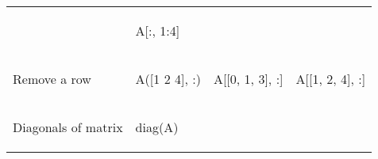 \documentclass[10pt, landscape]{article}
\newenvironment{Shaded}{}{}
\newcommand{\DecValTok}[1]{\textcolor[rgb]{0.25,0.63,0.44}{{#1}}}
\newcommand{\FloatTok}[1]{\textcolor[rgb]{0.25,0.63,0.44}{{#1}}}
\newcommand{\NormalTok}[1]{{#1}}
\begin{document}
\begin{multicols*}{2}
\begin{tabular}[ ]{@{}llll@{}}
\begin{minipage}[t]{0.23\columnwidth}
\strut
\end{minipage} & \begin{minipage}[t]{0.20\columnwidth}\raggedright\strut
\begin{Shaded}
\begin{Highlighting}[]
\NormalTok{A[:, }\FloatTok{1}\NormalTok{:}\FloatTok{4}\NormalTok{]}
\end{Highlighting}
\end{Shaded}
\strut
\end{minipage}\tabularnewline
\begin{minipage}[t]{0.23\columnwidth}\raggedright\strut
Remove a row\strut
\end{minipage} & \begin{minipage}[t]{0.23\columnwidth}\raggedright\strut
\begin{Shaded}
\begin{Highlighting}[]
\NormalTok{A([}\FloatTok{1} \FloatTok{2} \FloatTok{4}\NormalTok{], :)}
\end{Highlighting}
\end{Shaded}
\strut
\end{minipage} & \begin{minipage}[t]{0.23\columnwidth}\raggedright\strut
\begin{Shaded}
\begin{Highlighting}[]
\NormalTok{A[[}\DecValTok{0}\NormalTok{, }\DecValTok{1}\NormalTok{, }\DecValTok{3}\NormalTok{], :]}
\end{Highlighting}
\end{Shaded}
\strut
\end{minipage} & \begin{minipage}[t]{0.20\columnwidth}\raggedright\strut
\begin{Shaded}
\begin{Highlighting}[]
\NormalTok{A[[}\FloatTok{1}\NormalTok{, }\FloatTok{2}\NormalTok{, }\FloatTok{4}\NormalTok{], :]}
\end{Highlighting}
\end{Shaded}
\strut
\end{minipage}\tabularnewline
\begin{minipage}[t]{0.23\columnwidth}\raggedright\strut
Diagonals of matrix\strut
\end{minipage} & \begin{minipage}[t]{0.23\columnwidth}\raggedright\strut
\begin{Shaded}
\begin{Highlighting}[]
\NormalTok{diag(A)}
\end{Highlighting}

\end{Shaded}
\end{minipage}
\end{tabular}
\end{multicols*}
\end{document}
